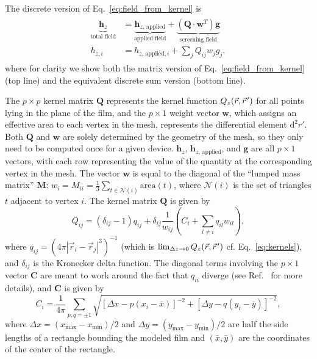 \documentclass[final,3p,times,twocolumn]{elsarticle}
\newcommand{\pvec}[1]{\vec{#1}\mkern2mu\vphantom{#1}}
\begin{document}
The discrete version of Eq.~\ref{eq:field_from_kernel} is
\begin{align}
\begin{split}
    \label{eq:field_from_kernel_num}
    \underbrace{\mathbf{h}_z}_\text{total field}
    &= \underbrace{\mathbf{h}_{z,\,\mathrm{applied}}}_\text{applied field}
    + \underbrace{(\mathbf{Q}\cdot\mathbf{w}^T)\mathbf{g}}_\text{screening field}\\
    h_{z, i} &= h_{z,\,\mathrm{applied}, i} + \sum_j Q_{ij}w_jg_j,
\end{split}
\end{align}
where for clarity we show both the matrix version of Eq.~\ref{eq:field_from_kernel} (top line) and the equivalent discrete sum version (bottom line).

The $p\times p$ kernel matrix $\mathbf{Q}$ represents the kernel function $Q_z(\vec{r},\pvec{r}')$ for all points lying in the plane of the film, and the $p\times 1$ weight vector $\mathbf{w}$, which assigns an effective area to each vertex in the mesh, represents the differential element $\mathrm{d}^2r'$. Both $\mathbf{Q}$ and $\mathbf{w}$ are solely determined by the geometry of the mesh, so they only need to be computed once for a given device. $\mathbf{h}_z$, $\mathbf{h}_{z,\,\mathrm{applied}}$, and $\mathbf{g}$ are all $p\times 1$ vectors, with each row representing the value of the quantity at the
corresponding vertex in the mesh. The vector $\mathbf{w}$ is equal to the diagonal of the ``lumped mass matrix'' $\mathbf{M}$: $w_i=M_{ii} = \frac{1}{3}\sum_{t\in\mathcal{N}(i)}\mathrm{area}(t)$,
where $\mathcal{N}(i)$ is the set of triangles $t$ adjacent to vertex $i$. The kernel matrix $\mathbf{Q}$ is given by
\begin{equation}
    \label{eq:kernel_matrix}
    Q_{ij} = (\delta_{ij}-1)q_{ij}
    + \delta_{ij}\frac{1}{w_{ij}}\left(C_i + \sum_{l\neq i}q_{il}w_{il}\right),
\end{equation}
where $q_{ij} = \left(4\pi|\vec{r}_i-\vec{r}_j|^3\right)^{-1}$
(which is $\lim_{\Delta z\to 0}Q_z(\vec{r},\pvec{r}')$ cf. Eq.~\ref{eq:kernels}),
and $\delta_{ij}$ is the Kronecker delta function. The diagonal terms involving the $p\times 1$ vector $\mathbf{C}$ are meant to work around the fact that $q_{ii}$ diverge (see Ref.~\cite{Brandt2005-wj} for more details), and $\mathbf{C}$ is given by
\begin{equation}
    \label{eq:C_vector}
    C_i = \frac{1}{4\pi}\sum_{p,q=\pm1}\sqrt{[\Delta x - p(x_i-\bar{x})]^{-2} + [\Delta y - q(y_i-\bar{y})]^{-2}},
\end{equation}
where $\Delta x=(x_\mathrm{max}-x_\mathrm{min})/2$ and $\Delta y=(y_\mathrm{max}-y_\mathrm{min})/2$ are half the side lengths of a rectangle bounding the modeled film and $(\bar{x}, \bar{y})$ are the coordinates of the center of the rectangle.
\end{document}
